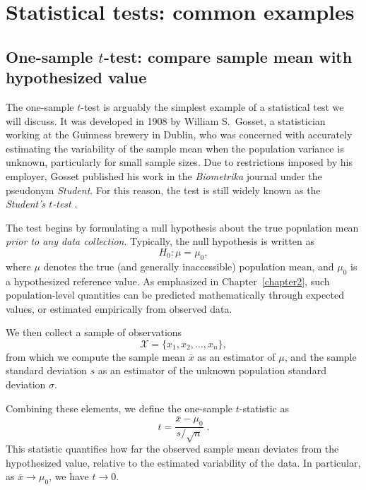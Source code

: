 \section{Statistical tests: common examples}

\subsection{One-sample \(t\)-test: compare sample mean with hypothesized value}

The one-sample \(t\)-test is arguably the simplest example of a statistical test we will discuss. It was developed in 1908 by William S.~Gosset, a statistician working at the Guinness brewery in Dublin, who was concerned with accurately estimating the variability of the sample mean when the population variance is unknown, particularly for small sample sizes. Due to restrictions imposed by his employer, Gosset published his work in the \textit{Biometrika} journal under the pseudonym \textit{Student}. For this reason, the test is still widely known as the \textit{Student’s \(t\)-test} \cite{student_1908_mean}.

\medskip

The test begins by formulating a null hypothesis about the true population mean \emph{prior to any data collection}. Typically, the null hypothesis is written as
\[
H_0 : \mu = \mu_0 ,
\]
where \(\mu\) denotes the true (and generally inaccessible) population mean, and \(\mu_0\) is a hypothesized reference value. As emphasized in Chapter~\ref{chapter2}, such population-level quantities can be predicted mathematically through expected values, or estimated empirically from observed data.

\medskip

We then collect a sample of observations
\[
\mathcal{X} = \{x_1, x_2, \dots, x_n\},
\]
from which we compute the sample mean \(\bar{x}\) as an estimator of \(\mu\), and the sample standard deviation \(s\) as an estimator of the unknown population standard deviation \(\sigma\).

\medskip

Combining these elements, we define the one-sample \(t\)-statistic as
\begin{equation}
    t = \frac{\bar{x} - \mu_0}{s/\sqrt{n}} \; .
    \label{t_statistic_one_sample}
\end{equation}
This statistic quantifies how far the observed sample mean deviates from the hypothesized value, relative to the estimated variability of the data. In particular, as \(\bar{x} \to \mu_0\), we have \(t \to 0\).

